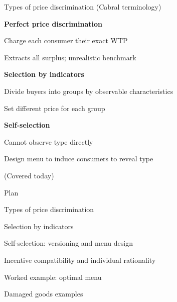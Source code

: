 \documentclass[notes,11pt, aspectratio=169]{beamer}
\newenvironment{wideitemize}{\itemize\addtolength{\itemsep}{10pt}}{\enditemize}
\newenvironment{wideenumerate}{\enumerate\addtolength{\itemsep}{10pt}}{\endenumerate}
\begin{document}
\begin{frame}{Types of price discrimination (Cabral terminology)}
	\begin{wideenumerate}
		\item \textbf{Perfect price discrimination}
		\begin{wideitemize}
			\vspace{3pt}
			\item Charge each consumer their exact WTP
			\item Extracts all surplus; unrealistic benchmark
		\end{wideitemize}
		\item \textbf{Selection by indicators}
		\begin{wideitemize}
			\vspace{3pt}
			\item Divide buyers into groups by observable characteristics
			\item Set different price for each group
		\end{wideitemize}
		\item \textbf{Self-selection}
		\begin{wideitemize}
			\vspace{3pt}
			\item Cannot observe type directly
			\item Design menu to induce consumers to reveal type
			\item (Covered today)
		\end{wideitemize}
	\end{wideenumerate}
\end{frame}

\begin{frame}{Plan}
  \begin{wideenumerate}
    \item Types of price discrimination
    \item Selection by indicators
    \item Self-selection: versioning and menu design
    \item Incentive compatibility and individual rationality
    \item Worked example: optimal menu
    \item Damaged goods examples
  \end{wideenumerate}
\end{frame}
\end{document}
